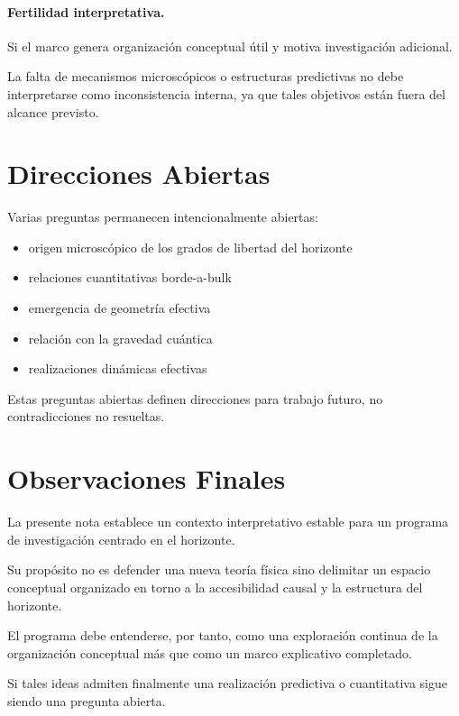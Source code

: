 \documentclass[12pt,a4paper]{article}
\begin{document}
\paragraph{Fertilidad interpretativa.} Si el marco genera organización conceptual útil y motiva investigación adicional.

La falta de mecanismos microscópicos o estructuras predictivas no debe interpretarse como inconsistencia interna, ya que tales objetivos están fuera del alcance previsto.

\section{Direcciones Abiertas}

Varias preguntas permanecen intencionalmente abiertas:

\begin{itemize}
  \item origen microscópico de los grados de libertad del horizonte
  \item relaciones cuantitativas borde-a-bulk
  \item emergencia de geometría efectiva
  \item relación con la gravedad cuántica
  \item realizaciones dinámicas efectivas
\end{itemize}

Estas preguntas abiertas definen direcciones para trabajo futuro, no contradicciones no resueltas.

\section{Observaciones Finales}

La presente nota establece un contexto interpretativo estable para un programa de investigación centrado en el horizonte.

Su propósito no es defender una nueva teoría física sino delimitar un espacio conceptual organizado en torno a la accesibilidad causal y la estructura del horizonte.

El programa debe entenderse, por tanto, como una exploración continua de la organización conceptual más que como un marco explicativo completado.

Si tales ideas admiten finalmente una realización predictiva o cuantitativa sigue siendo una pregunta abierta.
\end{document}

